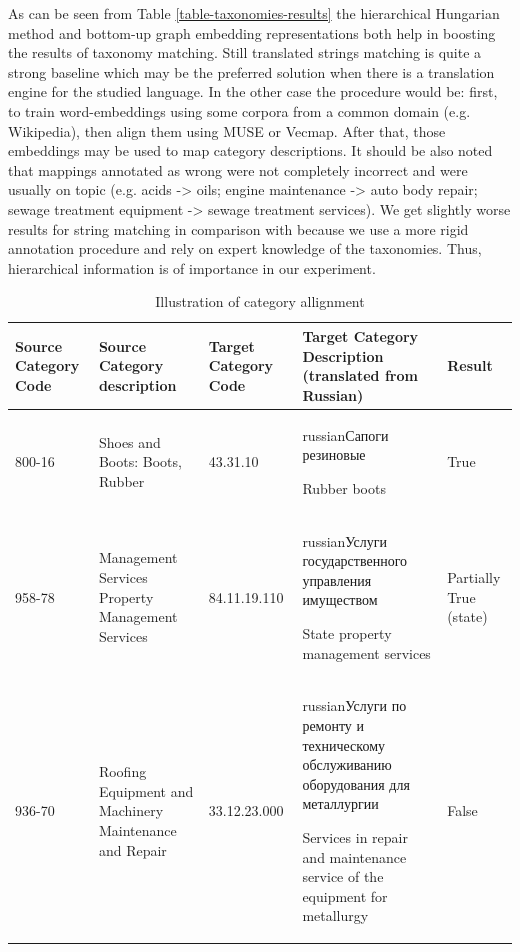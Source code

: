 \documentclass[11pt,a4paper]{article}
\begin{document}
As can be seen from Table \ref{table-taxonomies-results} the hierarchical Hungarian
method and bottom-up graph embedding representations both help in boosting the results of taxonomy matching. Still translated strings matching is quite a strong baseline which may be the preferred solution when there is a translation engine for the studied language. In the other case the procedure would be: first, to train word-embeddings using some corpora from a common domain (e.g. Wikipedia), then align them using MUSE or Vecmap. After that, those embeddings may be used to map category descriptions. It should be also noted that mappings annotated as wrong were not completely incorrect and were usually on topic (e.g. acids -> oils; engine maintenance -> auto body repair; sewage treatment equipment -> sewage treatment services).
We get slightly worse results for string matching in comparison with \cite{gordeev-fruct} because we use a more rigid annotation procedure and rely on expert knowledge of the taxonomies. Thus, hierarchical information is of importance in our experiment.
\begin{center}
	\begin{table}[t!]
		\label{table-annotation}		
		\small
		\centering
		\caption{Illustration of category allignment}
		\begin{tabular}{|p{2cm}|p{4cm}|p{2cm}|p{4cm}|p{1cm}|}
			\hline			
			{Source Category Code} & {Source Category description}& {Target Category Code} & {Target Category Description (translated from Russian)} & {Result}\\
			\hline
			{800-16} & {Shoes and Boots: Boots, Rubber} &
			{43.31.10} & {\begin{otherlanguage*}{russian}Сапоги резиновые\end{otherlanguage*} \newline Rubber boots} &
			{True}
			\\
			\hline
			958-78 & Management Services Property Management Services &
			{84.11.19.110} & \begin{otherlanguage*}{russian}Услуги государственного управления имуществом\end{otherlanguage*} \newline State property management services &
			Partially True (state)
			\\
			\hline
			936-70 & {Roofing Equipment and Machinery Maintenance and Repair} &
			{33.12.23.000} & \begin{otherlanguage*}{russian}Услуги по ремонту и техническому обслуживанию оборудования для металлургии
			\end{otherlanguage*} \newline Services in repair and maintenance service of the equipment for metallurgy &
			False 
			\\
			\hline
			
			
		\end{tabular}
	\end{table}
\end{center}
\end{document}
